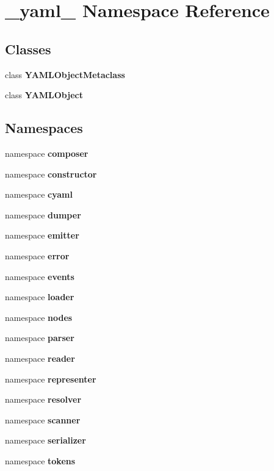 \section{\_\-yaml\_\- Namespace Reference}
\label{namespace__yaml__}


\subsection*{Classes}
\begin{CompactItemize}
\item 
class {\bf YAMLObjectMetaclass}
\item 
class {\bf YAMLObject}
\end{CompactItemize}
\subsection*{Namespaces}
\begin{CompactItemize}
\item 
namespace {\bf composer}
\item 
namespace {\bf constructor}
\item 
namespace {\bf cyaml}
\item 
namespace {\bf dumper}
\item 
namespace {\bf emitter}
\item 
namespace {\bf error}
\item 
namespace {\bf events}
\item 
namespace {\bf loader}
\item 
namespace {\bf nodes}
\item 
namespace {\bf parser}
\item 
namespace {\bf reader}
\item 
namespace {\bf representer}
\item 
namespace {\bf resolver}
\item 
namespace {\bf scanner}
\item 
namespace {\bf serializer}
\item 
namespace {\bf tokens}
\end{CompactItemize}

